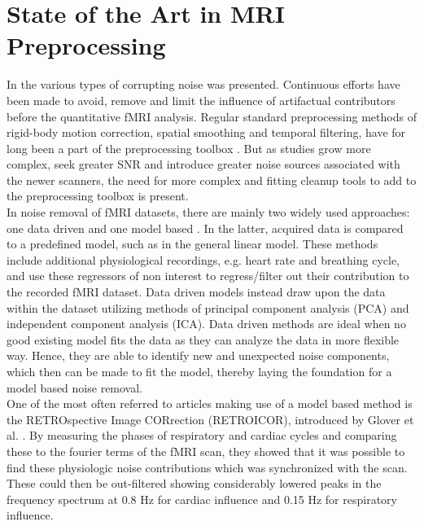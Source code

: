 \section{State of the Art in MRI Preprocessing} \label{art}

In  the various types of corrupting noise was presented. Continuous efforts have been made to avoid, remove and limit the influence of artifactual contributors before the quantitative fMRI analysis. Regular standard preprocessing methods of rigid-body motion correction, spatial smoothing and temporal filtering, have for long been a part of the preprocessing toolbox \cite{Poldrack2011,Salimi-Khorshidi2014}. But as studies grow more complex, seek greater SNR and introduce greater noise sources associated with the newer scanners, the need for more complex and fitting cleanup tools to add to the preprocessing toolbox is present. \cite{Wood2012,Liu2006} \\
In noise removal of fMRI datasets, there are mainly two widely used approaches: one data driven and one model based \cite{Salimi-Khorshidi2014,Iraji2016}.  In the latter, acquired data is compared to a predefined model, such as in the general linear model. These methods include additional physiological recordings, e.g. heart rate and breathing cycle, and use these regressors of non interest to regress/filter out their contribution to the recorded fMRI dataset. \cite{Salimi-Khorshidi2014,Iraji2016,Monti2011} Data driven models instead draw upon the data within the dataset utilizing methods of principal component analysis (PCA) and independent component analysis (ICA). Data driven methods are ideal when no good existing model fits the data as they can analyze the data in more flexible way. Hence, they are able to identify new and unexpected noise components, which then can be made to fit the model, thereby laying the foundation for a model based noise removal. \cite{Iraji2016} \\
One of the most often referred to articles making use of a model based method is the RETROspective Image CORrection (RETROICOR), introduced by Glover et al. \cite{Glover2000}. By measuring the phases of respiratory and cardiac cycles and comparing these to the fourier terms of the fMRI scan, they showed that it was possible to find these physiologic noise contributions which was synchronized with the scan. These could then be out-filtered showing considerably lowered peaks in the frequency spectrum at 0.8 Hz for cardiac influence and 0.15 Hz for respiratory influence. \cite{Glover2000} \\

